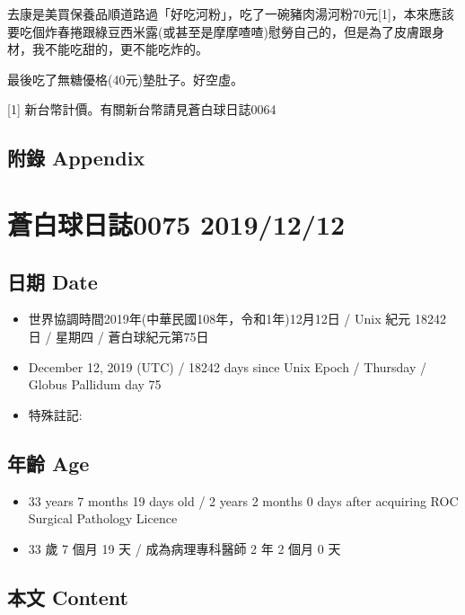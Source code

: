 \documentclass[
]{article}
\providecommand{\tightlist}{%
  \setlength{\itemsep}{0pt}\setlength{\parskip}{0pt}}
\begin{document}
去康是美買保養品順道路過「好吃河粉」，吃了一碗豬肉湯河粉70元{[}1{]}，本來應該要吃個炸春捲跟綠豆西米露(或甚至是摩摩喳喳)慰勞自己的，但是為了皮膚跟身材，我不能吃甜的，更不能吃炸的。

最後吃了無糖優格(40元)墊肚子。好空虛。

{[}1{]} 新台幣計價。有關新台幣請見蒼白球日誌0064

\hypertarget{ux9644ux9304-appendix-10}{%
\subsection{附錄 Appendix}\label{ux9644ux9304-appendix-10}}

\hypertarget{ux84bcux767dux7403ux65e5ux8a8c0075-20191212}{%
\section{蒼白球日誌0075
2019/12/12}\label{ux84bcux767dux7403ux65e5ux8a8c0075-20191212}}

\hypertarget{ux65e5ux671f-date-11}{%
\subsection{日期 Date}\label{ux65e5ux671f-date-11}}

\begin{itemize}
\tightlist
\item
  世界協調時間2019年(中華民國108年，令和1年)12月12日 / Unix 紀元 18242
  日 / 星期四 / 蒼白球紀元第75日
\item
  December 12, 2019 (UTC) / 18242 days since Unix Epoch / Thursday /
  Globus Pallidum day 75
\item
  特殊註記:
\end{itemize}

\hypertarget{ux5e74ux9f61-age-11}{%
\subsection{年齡 Age}\label{ux5e74ux9f61-age-11}}

\begin{itemize}
\tightlist
\item
  33 years 7 months 19 days old / 2 years 2 months 0 days after
  acquiring ROC Surgical Pathology Licence
\item
  33 歲 7 個月 19 天 / 成為病理專科醫師 2 年 2 個月 0 天
\end{itemize}

\hypertarget{ux672cux6587-content-11}{%
\subsection{本文 Content}\label{ux672cux6587-content-11}}
\end{document}
